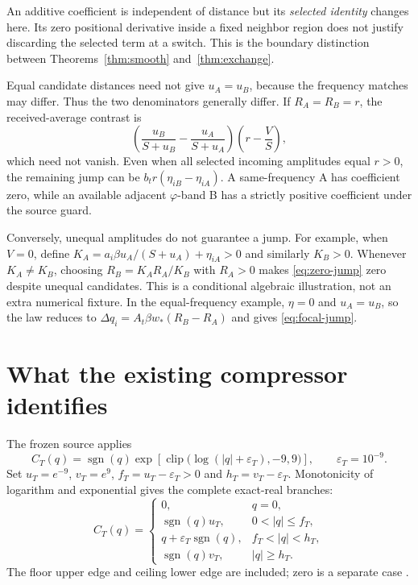 \documentclass[11pt,a4paper]{article}
\theoremstyle{remark}\newtheorem{remark}[theorem]{Remark}
\DeclareMathOperator{\sgn}{sgn}
\DeclareMathOperator{\clip}{clip}
\numberwithin{equation}{section}
\begin{document}
An additive coefficient is independent of distance but its \emph{selected
identity} changes here. Its zero positional derivative inside a fixed
neighbor region does not justify discarding the selected term at a switch.
This is the boundary distinction between Theorems~\ref{thm:smooth}
and~\ref{thm:exchange}.

Equal candidate distances need not give $u_A=u_B$, because the frequency
matches may differ. Thus the two denominators generally differ.
If $R_A=R_B=r$, the received-average contrast is
\[
\left(\frac{u_B}{S+u_B}-\frac{u_A}{S+u_A}\right)
\left(r-\frac VS\right),
\]
which need not vanish. Even when all selected incoming amplitudes equal
$r>0$, the remaining jump can be
$b_tr(\eta_{iB}-\eta_{iA})$. A same-frequency A has coefficient zero,
while an available adjacent $\varphi$-band B has a strictly positive
coefficient under the source guard.

Conversely, unequal amplitudes do not guarantee a jump. For example,
when $V=0$, define
$K_A=a_i\beta u_A/(S+u_A)+\eta_{iA}>0$ and similarly $K_B>0$.
Whenever $K_A\ne K_B$, choosing $R_B=K_AR_A/K_B$ with $R_A>0$ makes
\eqref{eq:zero-jump} zero despite unequal candidates. This is a conditional
algebraic illustration, not an extra numerical fixture.
In the equal-frequency example, $\eta=0$ and $u_A=u_B$, so the law reduces to
$\Delta q_i=A_t\beta w_*(R_B-R_A)$ and gives \eqref{eq:focal-jump}.

\section{What the existing compressor identifies}\label{sec:compression}

The frozen source applies
\begin{equation}
C_T(q)=\sgn(q)\exp\!\left[
\clip\big(\log(|q|+\varepsilon_T),-9,9\big)\right],
\qquad \varepsilon_T=10^{-9}.\label{eq:compressor}
\end{equation}
Set $u_T=e^{-9}$, $v_T=e^9$, $f_T=u_T-\varepsilon_T>0$ and
$h_T=v_T-\varepsilon_T$. Monotonicity of logarithm and exponential gives
the complete exact-real branches:
\begin{equation}
C_T(q)=
\begin{cases}
0,&q=0,\\
\sgn(q)u_T,&0<|q|\le f_T,\\
q+\varepsilon_T\sgn(q),&f_T<|q|<h_T,\\
\sgn(q)v_T,&|q|\ge h_T.
\end{cases}\label{eq:branches}
\end{equation}
The floor upper edge and ceiling lower edge are included; zero is a
separate case \cite[lines 42--44, 208--209]{T}.
\end{document}
